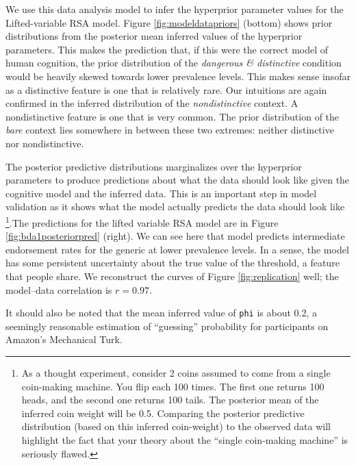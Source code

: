 \documentclass[10pt,letterpaper]{article}
\begin{document}

We use this data analysis model to infer the hyperprior parameter values for the Lifted-variable RSA model. Figure \ref{fig:modeldatapriors} (bottom) shows prior distributions from the posterior mean inferred values of the hyperprior parameters. This makes the prediction that, if this were the correct model of human cognition, the prior distribution of the \emph{dangerous \& distinctive} condition would be heavily skewed towards lower prevalence levels. This makes sense insofar as a distinctive feature is one that is relatively rare. Our intuitions are again confirmed in the inferred distribution of the \emph{nondistinctive} context. A nondistinctive feature is one that is very common. The prior distribution of the \emph{bare} context lies somewhere in between these two extremes: neither distinctive nor nondistinctive.

The posterior predictive distributions marginalizes over the hyperprior parameters to produce predictions about what the data should look like given the cognitive model and the inferred data. This is an important step in model validation as it shows what the model actually predicts the data should look like \footnote{As a thought experiment, consider 2 coins assumed to come from a single coin-making machine. You flip each 100 times. The first one returns 100 heads, and the second one returns 100 tails. The posterior mean of the inferred coin weight will be 0.5. Comparing the posterior predictive distribution (based on this inferred coin-weight) to the observed data will highlight the fact that your theory about the ``single coin-making machine'' is seriously flawed.}.The predictions for the lifted variable RSA model are in Figure \ref{fig:bda1posteriorpred} (right). We can see here that model predicts intermediate endorsement rates for the generic at lower prevalence levels. In a sense, the model has some persistent uncertainty about the true value of the threshold, a feature that people share. We reconstruct the curves of Figure \ref{fig:replication} well; the model--data correlation is $r = 0.97$.

It should also be noted that the mean inferred value of  \lstinline{phi} is about 0.2, a seemingly reasonable estimation of ``guessing'' probability for participants on Amazon's Mechanical Turk.
\end{document}

